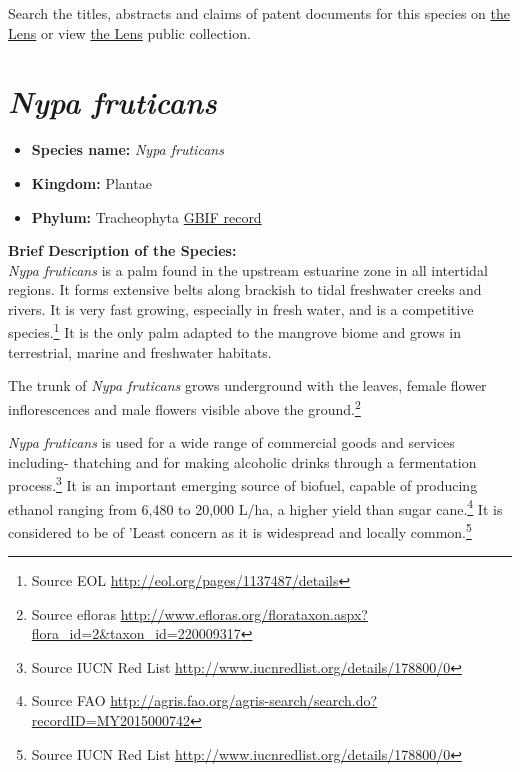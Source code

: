 \documentclass[openany]{book}
\providecommand{\tightlist}{%
  \setlength{\itemsep}{0pt}\setlength{\parskip}{0pt}}
\let\rmarkdownfootnote\footnote%
\def\footnote{\protect\rmarkdownfootnote}
\theoremstyle{definition}
\theoremstyle{definition}
\theoremstyle{definition}
\theoremstyle{remark}
\begin{document}
Search the titles, abstracts and claims of patent documents for this
species on
\href{https://www.lens.org/lens/search?q=title:(\%22Macrobrachium\%20rosenbergii\%22)\%20OR\%20abstract:(\%22Macrobrachium\%20rosenbergii\%22)\%20OR\%20claims:(\%22Macrobrachium\%20rosenbergii\%22)\&l=en\&preview=true}{the
Lens} or view \href{https://www.lens.org/lens/collection/167817}{the
Lens} public collection.

\hypertarget{nypa-fruticans}{%
\section{\texorpdfstring{\emph{Nypa
fruticans}}{Nypa fruticans}}\label{nypa-fruticans}}

\begin{itemize}
\tightlist
\item
  \textbf{Species name:} \emph{Nypa fruticans}
\item
  \textbf{Kingdom:} Plantae
\item
  \textbf{Phylum:} Tracheophyta
  \href{https://www.gbif.org/species/2738422}{GBIF record}
\end{itemize}

\textbf{Brief Description of the Species:}\\
\emph{Nypa fruticans} is a palm found in the upstream estuarine zone in
all intertidal regions. It forms extensive belts along brackish to tidal
freshwater creeks and rivers. It is very fast growing, especially in
fresh water, and is a competitive species.\footnote{Source EOL
  \url{http://eol.org/pages/1137487/details}} It is the only palm
adapted to the mangrove biome and grows in terrestrial, marine and
freshwater habitats.

The trunk of \emph{Nypa fruticans} grows underground with the leaves,
female flower inflorescences and male flowers visible above the
ground.\footnote{Source efloras
  \url{http://www.efloras.org/florataxon.aspx?flora_id=2\&taxon_id=220009317}}

\emph{Nypa fruticans} is used for a wide range of commercial goods and
services including- thatching and for making alcoholic drinks through a
fermentation process.\footnote{Source IUCN Red List
  \url{http://www.iucnredlist.org/details/178800/0}} It is an important
emerging source of biofuel, capable of producing ethanol ranging from
6,480 to 20,000 L/ha, a higher yield than sugar cane.\footnote{Source
  FAO
  \url{http://agris.fao.org/agris-search/search.do?recordID=MY2015000742}}
It is considered to be of 'Least concern as it is widespread and locally
common.\footnote{Source IUCN Red List
  \url{http://www.iucnredlist.org/details/178800/0}}
\end{document}
